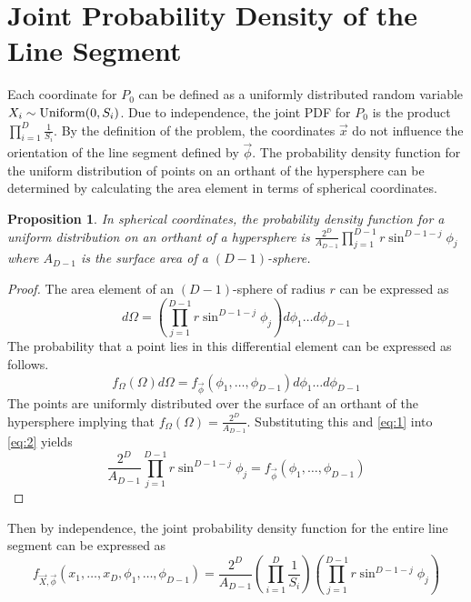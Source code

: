 \documentclass{article}
\newtheorem{proposition}{Proposition}
\begin{document}
\section{Joint Probability Density of the Line Segment} \label{s:needle pdf}
Each coordinate for $P_0$ can be defined as a uniformly distributed random variable $X_i\sim{\rm Uniform}(0,S_i)$. Due to independence, the joint PDF for $P_0$ is the product
$\prod_{i=1}^D \frac{1}{S_i}$. By the definition of the problem, the coordinates $\vec{x}$ do not influence the orientation of the line segment defined by $\vec{\phi}$. 
The probability density function for the uniform distribution of points on an orthant of the hypersphere can be determined by calculating the area element in terms of spherical coordinates.

\begin{proposition}
In spherical coordinates, the probability density function for a uniform distribution on an orthant of a hypersphere is $\frac{2^D}{A_{D-1}}\prod_{j=1}^{D-1}r\sin^{D-1-j}\phi_j$ where
$A_{D-1}$ is the surface area of a $(D-1)$-sphere.
\end{proposition}
\begin{proof}
	The area element of an $(D-1)$-sphere of radius $r$ can be expressed as 
	\begin{equation} \label{eq:1}
	d\Omega = \left(\prod_{j=1}^{D-1}r\sin^{D-1-j}\phi_j\right)d\phi_1 \hdots d\phi_{D-1}
	\end{equation}
	The probability that a point lies in this differential element can be expressed as follows.
	\begin{equation} \label{eq:2}
	f_{\Omega}(\Omega)d\Omega = f_{\vec{\phi}}(\phi_1, \hdots, \phi_{D-1})d\phi_1 \hdots d\phi_{D-1}
	\end{equation}
	The points are uniformly distributed over the surface of an orthant of the hypersphere implying that $f_{\Omega}(\Omega) = \frac{2^D}{A_{D-1}}$. Substituting this and
	\ref{eq:1} into \ref{eq:2} yields
	\begin{equation}
	\frac{2^D}{A_{D-1}}\prod_{j=1}^{D-1}r\sin^{D-1-j}\phi_j = f_{\vec{\phi}}(\phi_1, \hdots, \phi_{D-1})
	\end{equation}
\end{proof}

Then by independence, the joint probability density function for the entire line segment can be expressed as 
\begin{equation} 
	f_{\vec{X},\vec{\phi}}(x_1, \hdots, x_D, \phi_1, \hdots, \phi_{D-1}) = \frac{2^D}{A_{D-1}}\left(\prod_{i=1}^D\frac{1}{S_i}\right)\left(\prod_{j=1}^{D-1}r\sin^{D-1-j}\phi_j\right)
\end{equation} 
\end{document}
